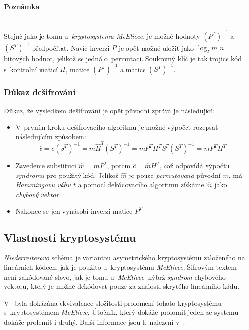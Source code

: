\documentclass[thesis=M,czech,hidelinks]{FITthesis}[2012/06/26]
\newcommand{\0}{{\textcolor[gray]{0.80}{0}}}
\begin{document}
\paragraph{Poznámka} \hfil \\
Stejně jako je tomu u~\emph{kryptosystému McEliece}, je možné hodnoty
$\left(P^T\right)^{-1}$ a $\left(S^T\right)^{-1}$ předpočítat. Navíc inverzi
$P$ je opět možné uložit jako $\log_2 m$ $n$-bitových hodnot, jelikož se jedná
o~permutaci. Soukromý klíč je tak trojice kód s~kontrolní maticí $H$,
matice $\left(P^T\right)^{-1}$ a matice $\left(S^T\right)^{-1}$.


\subsubsection{Důkaz dešifrování}
Důkaz, že výsledkem dešifrování je opět původní zpráva je následující:

\begin{itemize}
    \item V~prvním kroku dešifrovacího algoritmu je možné výpočet rozepsat
        následujícím způsobem:
    $$ \hat{c} =   c \left(S^T\right)^{-1} =
                    m \hat{H}^T \left(S^T\right)^{-1} =
                    m P^T H^T S^T \left(S^T\right)^{-1} =
                    m P^T H^T
    $$
    \item Zavedeme substituci $\hat{m} = m P^T$, potom $\hat{c} = \hat{m} H^T$,
        což odpovídá výpočtu \emph{syndromu} pro použitý kód. Jelikož $\hat{m}$
        je pouze \emph{permutovaná} původní $m$, má \emph{Hammingovu váhu} $t$
        a pomocí dekódovacího algoritmu získáme $\hat{m}$ jako \emph{chybový
        vektor}.
    \item Nakonec se jen vynásobí inverzí matice $P^T$

\end{itemize}

\subsection{Vlastnosti kryptosystému}
\emph{Niederreiterovo} schéma je variantou asymetrického kryptosystému
založeného na lineárních kódech, jak je použito u~kryptosystému
\emph{McEliece}. Šifrovým textem není zakódované slovo, jak je tomu
u~\emph{McEliece}, nýbrž \emph{syndrom} chybového vektoru, který je možné
dekódovat pouze za znalosti skrytého lineárního kódu.

V~\cite{XingLi} byla dokázána ekvivalence složitosti prolomení tohoto
kryptosystému s~kryptosystémem \emph{McEliece}. Útočník, který dokáže prolomit
jeden ze systémů dokáže prolomit i druhý. Další informace jsou k~nalezení
v~\cite{Niederreiter,Courtois}.
\end{document}
